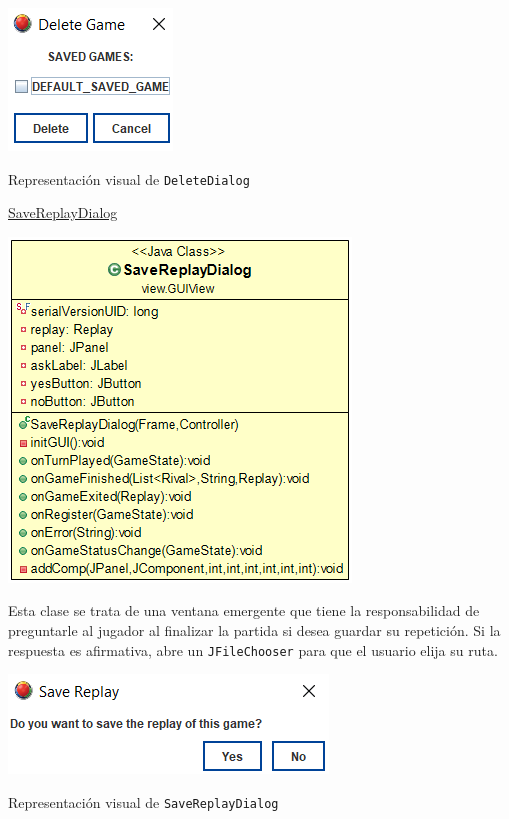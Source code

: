 \documentclass[12pt,a4paper,openright]{book}
\theoremstyle{break}
\begin{document}
\begin{center}
\includegraphics[scale=1]{delete-dialog-sprint6.png}

Representación visual de \texttt{DeleteDialog}

\end{center}

\newpage

\underline{SaveReplayDialog}

\begin{center}
\includegraphics[scale=0.6]{savereplaydialo.png}
\end{center}

Esta clase se trata de una ventana emergente que tiene la responsabilidad de preguntarle al jugador al finalizar la partida si desea guardar su repetición. Si la respuesta es afirmativa, abre un \texttt{JFileChooser} para que el usuario elija su ruta.

\begin{center}
\includegraphics[scale=1]{savereplaydialog-pic.png}

Representación visual de \texttt{SaveReplayDialog}
\end{center}
\end{document}
